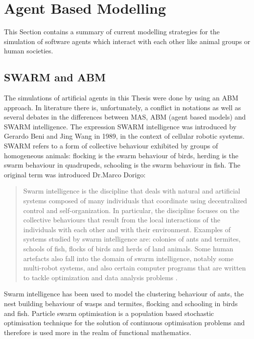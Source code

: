 \section{Agent Based Modelling \label{Chapter3:ABMcomplex}}

This Section contains a summary of current modelling strategies for the simulation
of software agents which interact with each other like animal groups or human societies.

\subsection{SWARM and ABM}
The simulations of artificial agents in this Thesis were done by using an ABM approach.
In literature there is, unfortunately, a conflict in notations as well as several debates
in the differences between MAS, ABM (agent based models) and
SWARM intelligence.
The expression SWARM intelligence \citep{SwarmIntelligence} was introduced by
Gerardo Beni and Jing Wang in 1989, in the context of cellular robotic systems.
SWARM refers to a form of collective behaviour exhibited by groups of
 homogeneous animals: flocking is the swarm behaviour of birds,
herding is the swarm behaviour in quadrupeds, schooling is the swarm behaviour
in fish.
The original term was introduced Dr.Marco Dorigo:
\begin{quote}
Swarm intelligence is the discipline that deals with natural and artificial systems
composed of many individuals that coordinate using decentralized control and self-organization.
In particular, the discipline focuses on the collective behaviours that result from
the local interactions of the individuals with each other and with their environment.
Examples of systems studied by swarm intelligence are: colonies of ants and termites,
schools of fish, flocks of birds and herds of land animals. Some human artefacts also
fall into the domain of swarm intelligence, notably some multi-robot systems,
and also certain computer programs that are written to tackle optimization and
data analysis problems \citep{Dorigo:2007}.
\end{quote}
Swarm intelligence has been used to model the clustering behaviour of
ants, the nest building behaviour of wasps and termites,
flocking and schooling in birds and fish.
Particle swarm optimisation \citep{JamesShi2001:PSOgeneral}
is a population based stochastic optimisation technique for the solution of
continuous optimisation problems and therefore is used more in the realm of
functional mathematics.


